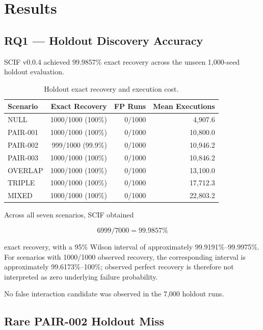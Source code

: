 \section{Results}

\subsection{RQ1 --- Holdout Discovery Accuracy}

SCIF v0.0.4 achieved 99.9857\% exact recovery across the unseen 1,000-seed holdout evaluation.

\begin{table}[t]
\caption{Holdout exact recovery and execution cost.}
\label{tab:holdout}
\centering
\footnotesize
\setlength{\tabcolsep}{8pt}
\begin{tabular}{lrrr}
\toprule
Scenario & Exact Recovery & FP Runs & Mean Executions \\
\midrule
NULL     & 1000/1000 (100\%) & 0/1000 & 4,907.6 \\
PAIR-001 & 1000/1000 (100\%) & 0/1000 & 10,800.0 \\
PAIR-002 & 999/1000 (99.9\%)  & 0/1000 & 10,946.2 \\
PAIR-003 & 1000/1000 (100\%) & 0/1000 & 10,846.2 \\
OVERLAP  & 1000/1000 (100\%) & 0/1000 & 13,100.0 \\
TRIPLE   & 1000/1000 (100\%) & 0/1000 & 17,712.3 \\
MIXED    & 1000/1000 (100\%) & 0/1000 & 22,803.2 \\
\bottomrule
\end{tabular}
\end{table}

Across all seven scenarios, SCIF obtained

\[
6999 / 7000 = 99.9857\%
\]

exact recovery, with a 95\% Wilson interval of approximately 99.9191\%--99.9975\%. For scenarios with 1000/1000 observed recovery, the corresponding interval is approximately 99.6173\%--100\%; observed perfect recovery is therefore not interpreted as zero underlying failure probability.

No false interaction candidate was observed in the 7,000 holdout runs.

\subsection{Rare PAIR-002 Holdout Miss}

